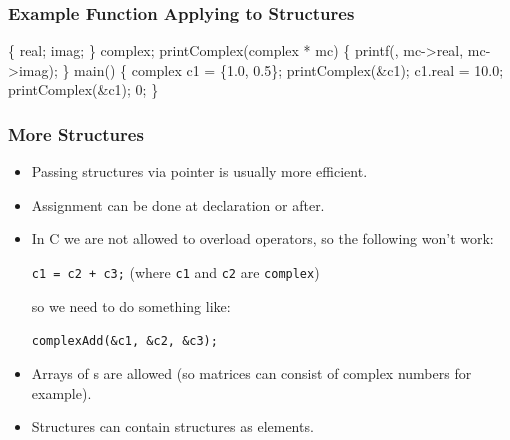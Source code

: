 \documentclass[smaller,handout,table]{beamer}
\begin{document}
\begin{frame}[fragile]
\frametitle{Example Function Applying to Structures}
\vspace{-0.2in}
\begin{semiverbatim}
\scriptsize
\kr\kl{} 
\kl
\kl{}
\kl\{
\kl   {} real;
\kl   {} imag;
\kl\} complex;
\kl
\kl{} printComplex(complex * mc)
\kl\{
\kl   printf(, mc->real, mc->imag);
\kl\}
\kl
\kl{} main()
\kl\{
\kl   complex c1 = \{1.0, 0.5\}; 
\kl   printComplex(&c1);       
\kl   c1.real = 10.0;          
\kl   printComplex(&c1);
\kl   {} 0;
\kl\}
\end{semiverbatim}
\end{frame}

\begin{frame}
\frametitle{More Structures}
\begin{itemize}
\item Passing structures via pointer is usually more efficient.
\item Assignment can be done at declaration or after.
\item In C we are not allowed to overload operators, so the following won't work:
\begin{center}
{\tt c1 = c2 + c3;} (where {\tt c1} and {\tt c2} are {\tt complex})
\end{center}
so we need to do something like:
\begin{center}
{\tt complexAdd(\&c1, \&c2, \&c3);}
\end{center}
\item Arrays of {\tt {}}s are allowed (so matrices can consist of complex numbers for example).
\item Structures can contain structures as elements.
\end{itemize}
\end{frame}
\end{document}

